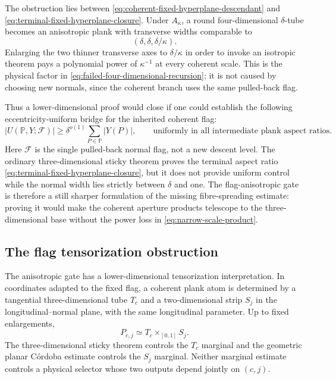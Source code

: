 \documentclass[11pt]{article}
\begin{document}
The obstruction lies between
\eqref{eq:coherent-fixed-hyperplane-descendant} and
\eqref{eq:terminal-fixed-hyperplane-closure}.  Under
\(A_\kappa\), a round four-dimensional \(\delta\)-tube becomes an
anisotropic plank with transverse widths comparable to
\begin{equation}\label{eq:narrow-anisotropic-plank-widths}
 (\delta,\delta,\delta/\kappa).
\end{equation}
Enlarging the two thinner transverse axes to \(\delta/\kappa\) in order
to invoke an isotropic theorem pays a polynomial power of
\(\kappa^{-1}\) at every coherent scale.  This is the physical factor in
\eqref{eq:failed-four-dimensional-recursion}; it is not caused by choosing
new normals, since the coherent branch uses the same pulled-back flag.

Thus a lower-dimensional proof would close if one could establish the
following eccentricity-uniform bridge for the inherited coherent flag:
\begin{equation}\label{eq:flag-anisotropic-sticky-gate}
 \boxed{
 |U(\mathbb P,Y;\mathscr F)|
 \ge\delta^{o(1)}\sum_{P\in\mathbb P}|Y(P)|,
 \qquad
 \text{uniformly in all intermediate plank aspect ratios}.}
\end{equation}
Here \(\mathscr F\) is the single pulled-back normal flag, not a new
descent level.  The ordinary three-dimensional sticky theorem proves the
terminal aspect ratio
\eqref{eq:terminal-fixed-hyperplane-closure}, but it does not provide
uniform control while the normal width lies strictly between
\(\delta\) and one.  The flag-anisotropic gate is therefore a still
sharper formulation of the missing fibre-spreading estimate: proving it would
make the coherent aperture products telescope to the three-dimensional base
without the power loss in \eqref{eq:narrow-scale-product}.

\subsection{The flag tensorization obstruction}

The anisotropic gate has a lower-dimensional tensorization interpretation.
In coordinates adapted to the fixed flag, a coherent plank
atom is determined by a tangential three-dimensional tube \(T_c\) and a
two-dimensional strip \(S_j\) in the longitudinal--normal plane, with the
same longitudinal parameter.  Up to fixed enlargements,
\begin{equation}\label{eq:flag-fibre-product-incidence}
 P_{c,j}\simeq T_c\times_{[0,1]}S_j .
\end{equation}
The three-dimensional sticky theorem controls the \(T_c\) marginal and
the geometric planar C\'ordoba estimate controls the \(S_j\) marginal.
Neither marginal estimate controls a physical selector whose two outputs
depend jointly on \((c,j)\).
\end{document}
